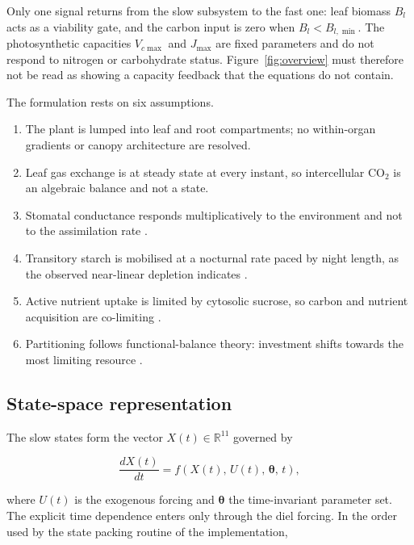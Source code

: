 Only one signal returns from the slow subsystem to the fast one: leaf biomass
$B_l$ acts as a viability gate, and the carbon input is zero when
$B_l < B_{l,\min}$. The photosynthetic capacities $V_{c\max}$ and $J_{\max}$ are
fixed parameters and do not respond to nitrogen or carbohydrate status.
Figure~\ref{fig:overview} must therefore not be read as showing a capacity
feedback that the equations do not contain.

The formulation rests on six assumptions.
\begin{enumerate}\itemsep1pt
\item[(A1)] The plant is lumped into leaf and root compartments; no within-organ
      gradients or canopy architecture are resolved.
\item[(A2)] Leaf gas exchange is at steady state at every instant, so
      intercellular CO$_2$ is an algebraic balance and not a state.
\item[(A3)] Stomatal conductance responds multiplicatively to the environment and
      not to the assimilation rate \citep{Jarvis1976,Damour2010}.
\item[(A4)] Transitory starch is mobilised at a nocturnal rate paced by night
      length, as the observed near-linear depletion indicates
      \citep{Graf2010,Scialdone2013}.
\item[(A5)] Active nutrient uptake is limited by cytosolic sucrose, so carbon and
      nutrient acquisition are co-limiting \citep{Smith2007}.
\item[(A6)] Partitioning follows functional-balance theory: investment shifts
      towards the most limiting resource
      \citep{Thornley1972,ThornleyJohnson1990}.
\end{enumerate}

\subsection{State-space representation}
\label{sec:state}

The slow states form the vector $X(t)\in\mathbb{R}^{11}$ governed by

\begin{equation}
\frac{dX(t)}{dt} = f\!\left(X(t),\,U(t),\,\boldsymbol{\theta},\,t\right),
\label{eq:ode_general}
\end{equation}

where $U(t)$ is the exogenous forcing and $\boldsymbol{\theta}$ the time-invariant
parameter set. The explicit time dependence enters only through the diel forcing. In
the order used by the state packing routine of the implementation,

